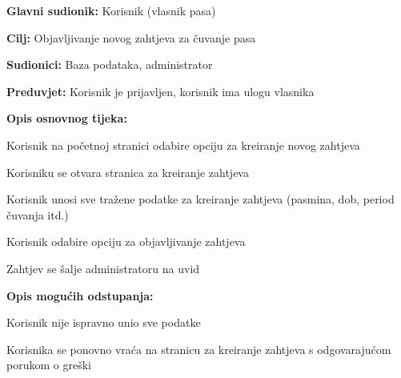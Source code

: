 					\noindent {}
					\begin{packed_item}
						
						\item \textbf{Glavni sudionik: } Korisnik (vlasnik pasa)
						\item  \textbf{Cilj:} Objavljivanje novog zahtjeva za čuvanje pasa
						\item  \textbf{Sudionici:} Baza podataka, administrator
						\item  \textbf{Preduvjet:} Korisnik je prijavljen, korisnik ima ulogu vlasnika
						\item  \textbf{Opis osnovnog tijeka:}
						
						\item[] \begin{packed_enum}
							
							\item Korisnik na početnoj stranici odabire opciju za kreiranje novog zahtjeva   
							\item Korisniku se otvara stranica za kreiranje zahtjeva
							\item Korisnik unosi sve tražene podatke za kreiranje zahtjeva (pasmina, dob, period čuvanja itd.)
							\item Korisnik odabire opciju za objavljivanje zahtjeva
							\item Zahtjev se šalje administratoru na uvid
							
						\end{packed_enum}
						
						\item  \textbf{Opis mogućih odstupanja:}
						
						\item[] \begin{packed_item}
							
							\item[4.a] Korisnik nije ispravno unio sve podatke
							\item[] \begin{packed_enum}
								
								\item Korisnika se ponovno vraća na stranicu za kreiranje zahtjeva s odgovarajućom porukom o greški 
								
							\end{packed_enum}
						\end{packed_item}
					\end{packed_item}		
				
